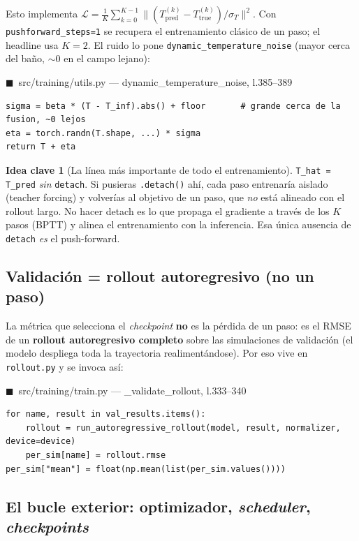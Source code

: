 \documentclass[11pt]{article}
\theoremstyle{definition}
\newtheorem{idea}{Idea clave}[section]
\theoremstyle{plain}
\newcommand{\srcref}[1]{\par\smallskip\noindent
  {\footnotesize\ttfamily\textcolor{srcblue}{$\blacksquare$\ #1}}\par\vspace{1pt}}
\begin{document}
Esto implementa
$\mathcal L=\frac1K\sum_{k=0}^{K-1}\big\lVert(T^{(k)}_{\mathrm{pred}}-T^{(k)}_{\mathrm{true}})/\sigma_T\big\rVert^2$.
Con \texttt{pushforward\_steps=1} se recupera el entrenamiento clásico de un paso;
el headline usa $K=2$. El ruido lo pone \texttt{dynamic\_temperature\_noise} (mayor
cerca del baño, $\sim0$ en el campo lejano):

\srcref{src/training/utils.py — dynamic\_temperature\_noise, l.385--389}
\begin{lstlisting}
sigma = beta * (T - T_inf).abs() + floor       # grande cerca de la fusion, ~0 lejos
eta = torch.randn(T.shape, ...) * sigma
return T + eta
\end{lstlisting}

\begin{idea}[La línea más importante de todo el entrenamiento]
\texttt{T\_hat = T\_pred} \emph{sin} \texttt{detach}. Si pusieras \texttt{.detach()}
ahí, cada paso entrenaría aislado (teacher forcing) y volverías al objetivo de un
paso, que \emph{no} está alineado con el rollout largo. No hacer detach es lo que
propaga el gradiente a través de los $K$ pasos (BPTT) y alinea el entrenamiento con
la inferencia. Esa única ausencia de \texttt{detach} \emph{es} el push-forward.
\end{idea}

\subsection{Validación = rollout autoregresivo (no un paso)}

La métrica que selecciona el \emph{checkpoint} \textbf{no} es la pérdida de un paso:
es el RMSE de un \textbf{rollout autoregresivo completo} sobre las simulaciones de
validación (el modelo despliega toda la trayectoria realimentándose). Por eso vive
en \texttt{rollout.py} y se invoca así:

\srcref{src/training/train.py — \_validate\_rollout, l.333--340}
\begin{lstlisting}
for name, result in val_results.items():
    rollout = run_autoregressive_rollout(model, result, normalizer, device=device)
    per_sim[name] = rollout.rmse
per_sim["mean"] = float(np.mean(list(per_sim.values())))
\end{lstlisting}

\subsection{El bucle exterior: optimizador, \emph{scheduler}, \emph{checkpoints}}
\end{document}
